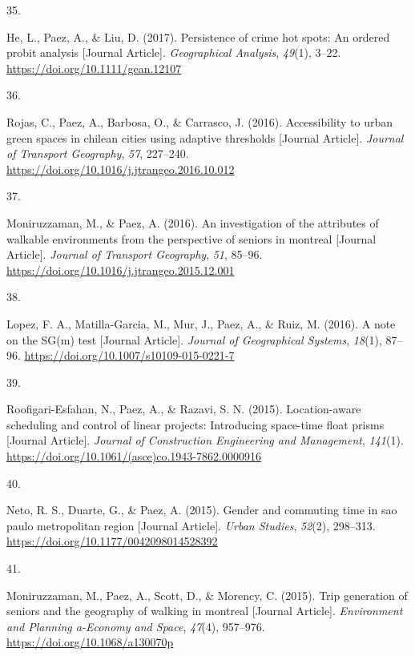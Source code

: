 \documentclass[11pt,a4paper,]{awesome-cv}
\newlength{\csllabelwidth}
\newcommand{\CSLLeftMargin}[1]{\parbox[t]{\csllabelwidth}{#1}}
\newcommand{\CSLRightInline}[1]{\parbox[t]{\linewidth - \csllabelwidth}{#1}}
\begin{document}
\leavevmode{}%
\CSLLeftMargin{35. }
\CSLRightInline{He, L., Paez, A., \& Liu, D. (2017). Persistence of
crime hot spots: An ordered probit analysis {[}Journal Article{]}.
\emph{Geographical Analysis}, \emph{49}(1), 3--22.
\url{https://doi.org/10.1111/gean.12107}}

\leavevmode{}%
\CSLLeftMargin{36. }
\CSLRightInline{Rojas, C., Paez, A., Barbosa, O., \& Carrasco, J.
(2016). Accessibility to urban green spaces in chilean cities using
adaptive thresholds {[}Journal Article{]}. \emph{Journal of Transport
Geography}, \emph{57}, 227--240.
\url{https://doi.org/10.1016/j.jtrangeo.2016.10.012}}

\leavevmode{}%
\CSLLeftMargin{37. }
\CSLRightInline{Moniruzzaman, M., \& Paez, A. (2016). An investigation
of the attributes of walkable environments from the perspective of
seniors in montreal {[}Journal Article{]}. \emph{Journal of Transport
Geography}, \emph{51}, 85--96.
\url{https://doi.org/10.1016/j.jtrangeo.2015.12.001}}

\leavevmode{}%
\CSLLeftMargin{38. }
\CSLRightInline{Lopez, F. A., Matilla-Garcia, M., Mur, J., Paez, A., \&
Ruiz, M. (2016). A note on the SG(m) test {[}Journal Article{]}.
\emph{Journal of Geographical Systems}, \emph{18}(1), 87--96.
\url{https://doi.org/10.1007/s10109-015-0221-7}}

\leavevmode{}%
\CSLLeftMargin{39. }
\CSLRightInline{Roofigari-Esfahan, N., Paez, A., \& Razavi, S. N.
(2015). Location-aware scheduling and control of linear projects:
Introducing space-time float prisms {[}Journal Article{]}. \emph{Journal
of Construction Engineering and Management}, \emph{141}(1).
\url{https://doi.org/10.1061/(asce)co.1943-7862.0000916}}

\leavevmode{}%
\CSLLeftMargin{40. }
\CSLRightInline{Neto, R. S., Duarte, G., \& Paez, A. (2015). Gender and
commuting time in sao paulo metropolitan region {[}Journal Article{]}.
\emph{Urban Studies}, \emph{52}(2), 298--313.
\url{https://doi.org/10.1177/0042098014528392}}

\leavevmode{}%
\CSLLeftMargin{41. }
\CSLRightInline{Moniruzzaman, M., Paez, A., Scott, D., \& Morency, C.
(2015). Trip generation of seniors and the geography of walking in
montreal {[}Journal Article{]}. \emph{Environment and Planning a-Economy
and Space}, \emph{47}(4), 957--976.
\url{https://doi.org/10.1068/a130070p}}
\end{document}

